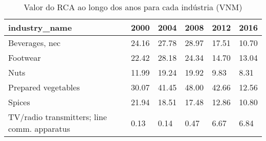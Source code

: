 \begin{table}
\centering
\caption{Valor do RCA ao longo dos anos para cada indústria (VNM)}
\begin{tabular}{p{6cm}p{1.5cm}p{1.5cm}p{1.5cm}p{1.5cm}p{1.5cm}}
\toprule
                              industry\_name &  2000 &  2004 &  2008 &  2012 &  2016 \\
\midrule
                             Beverages, nec & 24.16 & 27.78 & 28.97 & 17.51 & 10.70 \\
                                   Footwear & 22.42 & 28.18 & 24.34 & 14.70 & 13.04 \\
                                       Nuts & 11.99 & 19.24 & 19.92 &  9.83 &  8.31 \\
                        Prepared vegetables & 30.07 & 41.45 & 48.00 & 42.66 & 12.56 \\
                                     Spices & 21.94 & 18.51 & 17.48 & 12.86 & 10.80 \\
TV/radio transmitters; line comm. apparatus &  0.13 &  0.14 &  0.47 &  6.67 &  6.84 \\
\bottomrule
\end{tabular}
\end{table}
